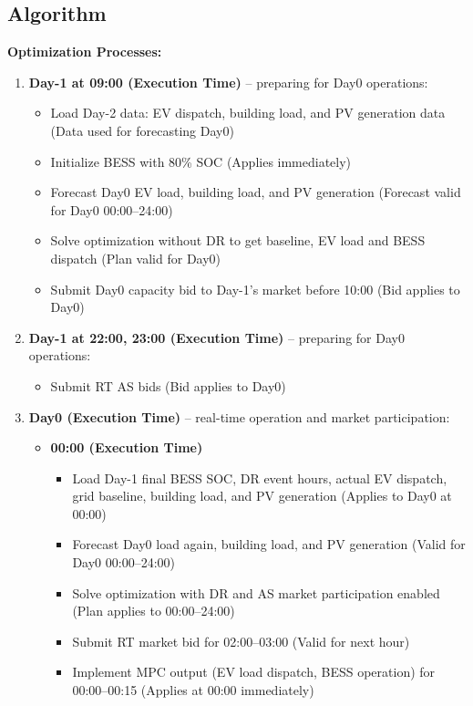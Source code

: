 \documentclass[conference]{IEEEtran}
\begin{document}
\subsection{Algorithm}
\vspace{0.5em}
\noindent
\textbf{Optimization Processes:}
\begin{enumerate}
    \item \textbf{Day-1 at 09:00 (Execution Time)} – preparing for Day0 operations:
    \begin{itemize}
        \item Load Day-2 data: EV dispatch, building load, and PV generation data \hfill (Data used for forecasting Day0)
        \item Initialize BESS with 80\% SOC \hfill (Applies immediately)
        \item Forecast Day0 EV load, building load, and PV generation \hfill (Forecast valid for Day0 00:00–24:00)
        \item Solve optimization without DR to get baseline, EV load and BESS dispatch \hfill (Plan valid for Day0)
        \item Submit Day0 capacity bid to Day-1's market before 10:00 \hfill (Bid applies to Day0)
    \end{itemize}

    \item \textbf{Day-1 at 22:00, 23:00 (Execution Time)} – preparing for Day0 operations:
    \begin{itemize}
        \item Submit RT AS bids (Bid applies to Day0)
    \end{itemize}
    
    \item \textbf{Day0 (Execution Time)} – real-time operation and market participation:
    \begin{itemize}
        \item \textbf{00:00 (Execution Time)}
        \begin{itemize}
            \item Load Day-1 final BESS SOC, DR event hours, actual EV dispatch, grid baseline, building load, and PV generation (Applies to Day0 at 00:00)
            \item Forecast Day0 load again, building load, and PV generation (Valid for Day0 00:00–24:00)
            \item Solve optimization with DR and AS market participation enabled (Plan applies to 00:00–24:00)
            \item Submit RT market bid for 02:00–03:00 (Valid for next hour)
            \item Implement MPC output (EV load dispatch, BESS operation) for 00:00–00:15 (Applies at 00:00 immediately)
        \end{itemize}
        

\end{itemize}
\end{enumerate}
\end{document}
